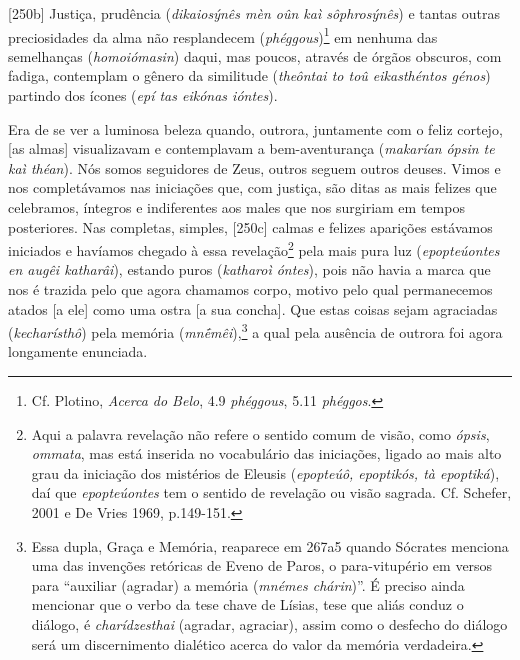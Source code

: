 {[}250b{]} Justiça, prudência (\emph{dikaiosýnês mèn oûn kaì
sôphrosýnês}) e tantas outras preciosidades da alma não resplandecem
(\emph{phéggous})\footnote{Cf. Plotino, \emph{Acerca do Belo}, 4.9
  \emph{phéggous}, 5.11 \emph{phéggos}.} em nenhuma das semelhanças
(\emph{homoiómasin}) daqui, mas poucos, através de órgãos obscuros, com
fadiga, contemplam o gênero da similitude (\emph{theôntai to toû
eikasthéntos génos}) partindo dos ícones (\emph{epí tas eikónas
ióntes}).

Era de se ver a luminosa beleza quando, outrora, juntamente com o feliz
cortejo, {[}as almas{]} visualizavam e contemplavam a bem-aventurança
(\emph{makarían} \emph{ópsin te kaì théan}). Nós somos seguidores de
Zeus, outros seguem outros deuses. Vimos e nos completávamos nas
iniciações que, com justiça, são ditas as mais felizes que celebramos,
íntegros e indiferentes aos males que nos surgiriam em tempos
posteriores. Nas completas, simples, {[}250c{]} calmas e felizes
aparições estávamos iniciados e havíamos chegado à essa
revelação\footnote{Aqui a palavra revelação não refere o sentido comum
  de visão, como \emph{ópsis}, \emph{ommata}, mas está inserida no
  vocabulário das iniciações, ligado ao mais alto grau da iniciação dos
  mistérios de Eleusis (\emph{epopteúô, epoptikós, tà epoptiká}), daí
  que \emph{epopteúontes} tem o sentido de revelação ou visão sagrada.
  Cf. Schefer, 2001 e De Vries 1969, p.149-151.} pela mais pura luz
(\emph{epopteúontes en augêi katharâi}), estando puros (\emph{katharoì
óntes}), pois não havia a marca que nos é trazida pelo que agora
chamamos corpo, motivo pelo qual permanecemos atados {[}a ele{]} como
uma ostra {[}a sua concha{]}. Que estas coisas sejam agraciadas
(\emph{kecharísthô}) pela memória (\emph{mnḗmêi}),\footnote{Essa dupla,
  Graça e Memória, reaparece em 267a5 quando Sócrates menciona uma das
  invenções retóricas de Eveno de Paros, o para-vitupério em versos para
  ``auxiliar (agradar) a memória (\emph{mnémes chárin})''. É preciso
  ainda mencionar que o verbo da tese chave de Lísias, tese que aliás
  conduz o diálogo, é \emph{charídzesthai} (agradar, agraciar), assim
  como o desfecho do diálogo será um discernimento dialético acerca do
  valor da memória verdadeira.} a qual pela ausência de outrora foi
agora longamente enunciada.


